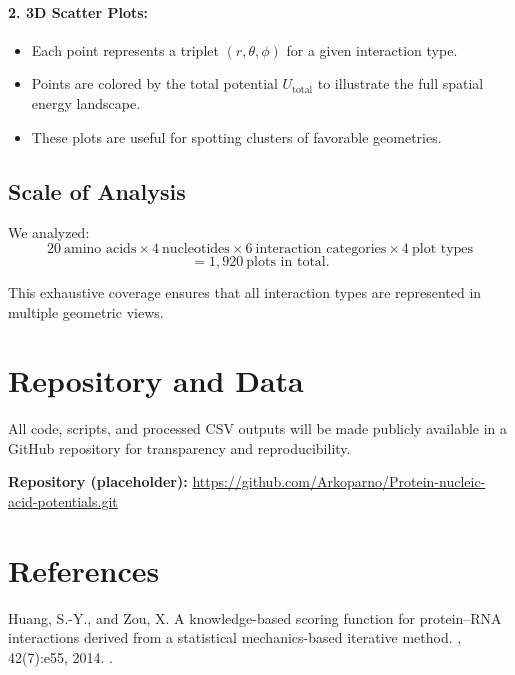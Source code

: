 \documentclass[12pt,a4paper]{report}
\begin{document}
\paragraph{2. 3D Scatter Plots:}
\begin{itemize}
    \item Each point represents a triplet $(r, \theta, \phi)$ for a given interaction type.
    \item Points are colored by the total potential $U_{\text{total}}$ to illustrate the full spatial energy landscape.
    \item These plots are useful for spotting clusters of favorable geometries.
\end{itemize}

\subsection*{Scale of Analysis}

We analyzed:
\[
20 \ \text{amino acids} \times 4 \ \text{nucleotides} \times 6 \ \text{interaction categories} \times 4 \ \text{plot types}
\]
\[
= 1{,}920 \ \text{plots \ in \ total}.
\]

This exhaustive coverage ensures that all interaction types are represented in multiple geometric views.
\printindex

\newpage
\section*{Repository and Data}

All code, scripts, and processed CSV outputs will be made publicly available in a GitHub repository for transparency and reproducibility.

\textbf{Repository (placeholder):} \url{https://github.com/Arkoparno/Protein-nucleic-acid-potentials.git}

\vspace{2 cm}

\section*{References}



Huang, S.-Y., and Zou, X.
\newblock A knowledge-based scoring function for protein--RNA interactions derived from a statistical mechanics-based iterative method.
, 42(7):e55, 2014.
\newblock {}.
\end{document}
